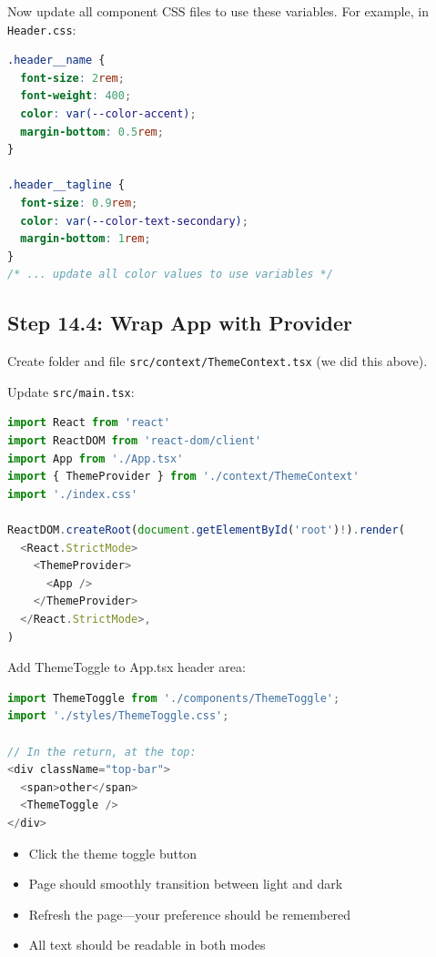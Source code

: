 \documentclass[12pt,a4paper]{article}
\begin{document}
Now update all component CSS files to use these variables. For example, in \texttt{Header.css}:

\begin{lstlisting}[language=CSS,caption={Update Header.css}]
.header__name {
  font-size: 2rem;
  font-weight: 400;
  color: var(--color-accent);
  margin-bottom: 0.5rem;
}

.header__tagline {
  font-size: 0.9rem;
  color: var(--color-text-secondary);
  margin-bottom: 1rem;
}
/* ... update all color values to use variables */
\end{lstlisting}

\subsection{Step 14.4: Wrap App with Provider}

Create folder and file \texttt{src/context/ThemeContext.tsx} (we did this above).

Update \texttt{src/main.tsx}:

\begin{lstlisting}[language=JavaScript,caption={src/main.tsx with ThemeProvider}]
import React from 'react'
import ReactDOM from 'react-dom/client'
import App from './App.tsx'
import { ThemeProvider } from './context/ThemeContext'
import './index.css'

ReactDOM.createRoot(document.getElementById('root')!).render(
  <React.StrictMode>
    <ThemeProvider>
      <App />
    </ThemeProvider>
  </React.StrictMode>,
)
\end{lstlisting}

Add ThemeToggle to App.tsx header area:

\begin{lstlisting}[language=JavaScript,caption={Add ThemeToggle to layout}]
import ThemeToggle from './components/ThemeToggle';
import './styles/ThemeToggle.css';

// In the return, at the top:
<div className="top-bar">
  <span>other</span>
  <ThemeToggle />
</div>
\end{lstlisting}

\begin{checkpoint}
\begin{itemize}
    \item[$\square$] Click the theme toggle button
    \item[$\square$] Page should smoothly transition between light and dark
    \item[$\square$] Refresh the page---your preference should be remembered
    \item[$\square$] All text should be readable in both modes
\end{itemize}
\end{checkpoint}
\end{document}

